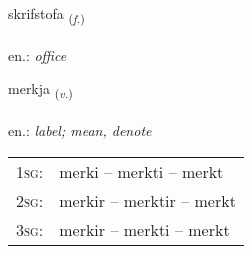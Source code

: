 \documentclass[frontgrid, backgrid]{flacards}\usepackage[]{graphicx}\usepackage[]{xcolor}
\begin{document}
\renewcommand{\flhead}{\vskip5pt \fboxsep=0pt {\small\bfseries\footnotesize Nafnorð | Noun}}
\renewcommand{\fcfoot}{\vskip5pt \fboxsep=0pt \hspace{2pt}{\small\bfseries\footnotesize 1K}}

\renewcommand{\blhead}{\vskip5pt {\small\bfseries\footnotesize Nafnorð | Noun }}
\renewcommand{\bcfoot}{\vskip5pt \hspace{2pt}{\small\bfseries\footnotesize 1K}}


{skrifstofa \small{\textsubscript{(\textit{f.})}} \\[1ex] %
\textphonetic{[skrɪfstɔva]} \\
en.: \emph{office} \\  [2ex]
\renewcommand*{\arraystretch}{0.8}
}

\renewcommand{\flhead}{\vskip5pt \fboxsep=0pt {\small\bfseries\footnotesize Sagnorð | Verb}}
\renewcommand{\fcfoot}{\vskip5pt \fboxsep=0pt \hspace{2pt}{\small\bfseries\footnotesize 1K}}

\renewcommand{\blhead}{\vskip5pt {\small\bfseries\footnotesize Sagnorð | Verb }}
\renewcommand{\bcfoot}{\vskip5pt \hspace{2pt}{\small\bfseries\footnotesize 1K}}


{merkja \small{\textsubscript{(\textit{v.})}} \\[1ex] %
\textphonetic{[mɛr̥ca]} \\
en.: \emph{label; mean, denote} \\  [2ex]
\renewcommand*{\arraystretch}{0.8}
\begin{tabular}{p{1cm}l}
\textsc{1sg}: & merki -- merkti -- merkt \\ 
\textsc{2sg}: & merkir -- merktir -- merkt \\ 
\textsc{3sg}: & merkir -- merkti -- merkt \\ 
\end{tabular}
}
\end{document}
